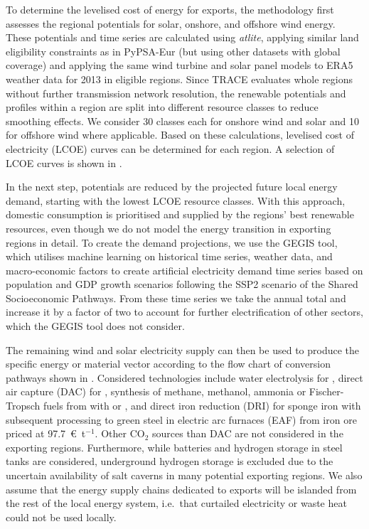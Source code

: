 To determine the levelised cost of energy for exports, the methodology first
assesses the regional potentials for solar, onshore, and offshore wind energy.
These potentials and time series are calculated using
\textit{atlite},\cite{hofmannAtliteLightweight2021} applying similar land
eligibility constraints as in PyPSA-Eur (but using other datasets with global
coverage) and applying the same wind turbine and solar panel models to
ERA5\cite{ecmwf} weather data for 2013 in eligible regions. Since TRACE
evaluates whole regions without further transmission network resolution, the
renewable potentials and profiles within a region are split into different
resource classes to reduce smoothing effects. We consider 30 classes each for
onshore wind and solar and 10 for offshore wind where applicable. Based on these
calculations, levelised cost of electricity (LCOE) curves can be determined for
each region. A selection of LCOE curves is shown in
.


In the next step, potentials are reduced by the projected future local energy
demand, starting with the lowest LCOE resource classes. With this approach,
domestic consumption is prioritised and supplied by the regions' best renewable
resources, even though we do not model the energy transition in exporting
regions in detail. To create the demand projections, we use the
GEGIS\cite{mattssonAutopilotEnergyModels2021} tool, which utilises machine
learning on historical time series, weather data, and macro-economic factors to
create artificial electricity demand time series based on population and GDP
growth scenarios following the SSP2 scenario of the Shared Socioeconomic
Pathways.\cite{riahiSharedSocioeconomicPathways2017} From these time series we
take the annual total and increase it by a factor of two to account for further
electrification of other sectors, which the GEGIS tool does not consider.


The remaining wind and solar electricity supply can then be used to produce the
specific energy or material vector according to the flow chart of conversion
pathways shown in . Considered technologies
include water electrolysis for , direct air capture (DAC) for ,
synthesis of methane, methanol, ammonia or Fischer-Tropsch fuels from 
with  or , and  direct iron reduction (DRI) for sponge
iron with subsequent processing to green steel in electric arc furnaces (EAF)
from iron ore priced at
97.7~\euro{}~t$^{-1}$.\cite{missionpossiblepartnershipSteelSectorTransition2022}
Other CO$_2$ sources than DAC are not considered in the exporting regions.
Furthermore, while batteries and hydrogen storage in steel tanks are considered,
underground hydrogen storage is excluded due to the uncertain availability of
salt caverns in many potential exporting
regions.\cite{hevinUndergroundStorageHydrogen2019,hydrogentcp-task42UndergroundHydrogenStorage2023}
We also assume that the energy supply chains dedicated to exports will be
islanded from the rest of the local energy system, i.e.~that curtailed
electricity or waste heat could not be used locally.

